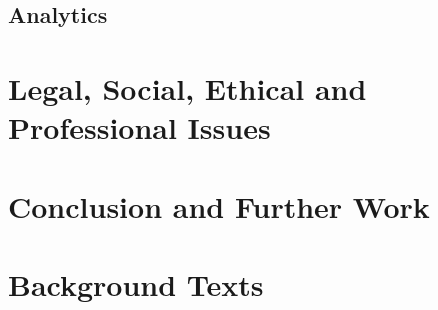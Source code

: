\documentclass{article}
\begin{document}
\subsection{Analytics}

\section{Legal, Social, Ethical and Professional Issues}

\section{Conclusion and Further Work}

\section{Background Texts}



\end{document}
